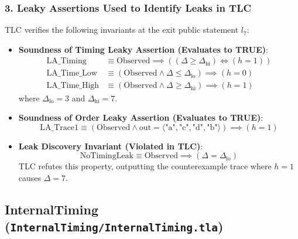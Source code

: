 \documentclass[a4paper,11pt]{article}
\begin{document}
\subsubsection{3. Leaky Assertions Used to Identify Leaks in TLC}
TLC verifies the following invariants at the exit public statement $l_7$:
\begin{itemize}
    \item \textbf{Soundness of Timing Leaky Assertion (Evaluates to TRUE)}:
    \begin{align*}
        \text{LA\_Timing} &\equiv \text{Observed} \implies ((\Delta \ge \Delta_{\text{hi}}) \iff (h = 1))\\
        \text{LA\_Time\_Low} &\equiv (\text{Observed} \land \Delta \le \Delta_{\text{lo}}) \implies (h = 0)\\
        \text{LA\_Time\_High} &\equiv (\text{Observed} \land \Delta \ge \Delta_{\text{hi}}) \implies (h = 1)
    \end{align*}
    where $\Delta_{\text{lo}} = 3$ and $\Delta_{\text{hi}} = 7$.
    \item \textbf{Soundness of Order Leaky Assertion (Evaluates to TRUE)}:
    $$\text{LA\_Trace1} \equiv (\text{Observed} \land \text{out} = \langle \text{"a"}, \text{"c"}, \text{"d"}, \text{"b"} \rangle) \implies (h = 1)$$
    \item \textbf{Leak Discovery Invariant (Violated in TLC)}:
    $$\text{NoTimingLeak} \equiv \text{Observed} \implies (\Delta = \Delta_{\text{lo}})$$
    TLC refutes this property, outputting the counterexample trace where $h = 1$ causes $\Delta = 7$.
\end{itemize}

\bigskip

\subsection{InternalTiming (\texttt{InternalTiming/InternalTiming.tla})}
\end{document}
